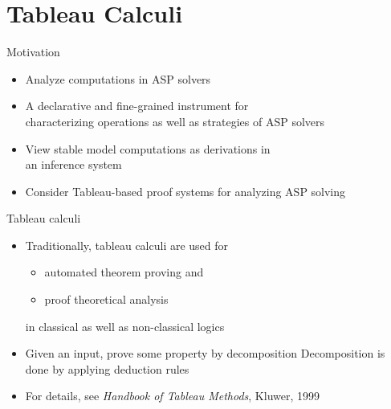 \section{Tableau Calculi}
\begin{frame}{Motivation}
  \bigskip
  \begin{itemize}
  \item<1->  Analyze computations in ASP solvers
    \smallskip
  \item<1-> 
    A declarative and fine-grained instrument for \\ characterizing
    operations as well as strategies of ASP solvers
    \bigskip
  \item<2-> 
    View stable model computations as derivations in\\ an inference system
  \item<3-> [] Consider \alert{Tableau-based proof systems} for analyzing ASP solving
\end{itemize}
\end{frame}
\begin{frame}{Tableau calculi}
  \bigskip
  \begin{itemize}
  \item Traditionally, tableau calculi are used for
    \begin{itemize}
    \item automated theorem proving and
    \item proof theoretical analysis
    \end{itemize}
    in classical as well as non-classical logics
    \medskip
  \item {}
    Given an input, prove some property by decomposition
    Decomposition is done by applying deduction rules
  \item For details, see \emph{Handbook of Tableau Methods}, Kluwer, 1999
  \end{itemize}
\end{frame}
